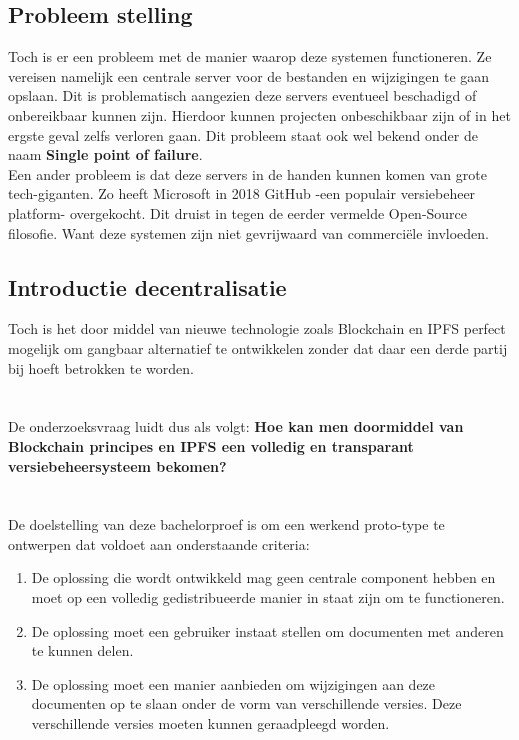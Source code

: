 \subsection{Probleem stelling}
Toch is er een probleem met de manier waarop deze systemen functioneren. Ze vereisen namelijk een centrale server voor de bestanden en wijzigingen te gaan opslaan. Dit is problematisch aangezien deze servers eventueel beschadigd of onbereikbaar kunnen zijn. Hierdoor kunnen projecten onbeschikbaar zijn of in het ergste geval zelfs verloren gaan. Dit probleem staat ook wel bekend onder de naam \textbf{Single point of failure}.\\

Een ander probleem is dat deze servers in de handen kunnen komen van grote tech-giganten. Zo heeft Microsoft in 2018 GitHub -een populair versiebeheer platform- overgekocht. Dit druist in tegen de eerder vermelde Open-Source filosofie. Want deze systemen zijn niet gevrijwaard van commerciële invloeden.\\

\subsection{Introductie decentralisatie}

Toch is het door middel van nieuwe technologie zoals Blockchain en IPFS perfect mogelijk om gangbaar alternatief te ontwikkelen zonder dat daar een derde partij bij hoeft betrokken te worden.


\section{}
\label{sec:onderzoeksvraag}
De onderzoeksvraag luidt dus als volgt: \textbf{Hoe kan men doormiddel van Blockchain principes en IPFS een volledig en transparant versiebeheersysteem bekomen?}


\section{}
\label{sec:onderzoeksdoelstelling}

De doelstelling van deze bachelorproef is om een werkend proto-type te ontwerpen dat voldoet aan onderstaande criteria:

\begin{enumerate}
	\item De oplossing die wordt ontwikkeld mag geen centrale component hebben en moet op een volledig gedistribueerde manier in staat zijn om te functioneren.
	\item De oplossing moet een gebruiker instaat stellen om documenten met anderen te kunnen delen.
	\item De oplossing moet een manier aanbieden om wijzigingen aan deze documenten op te slaan onder de vorm van verschillende versies. Deze verschillende versies moeten kunnen geraadpleegd worden.
\end{enumerate}

